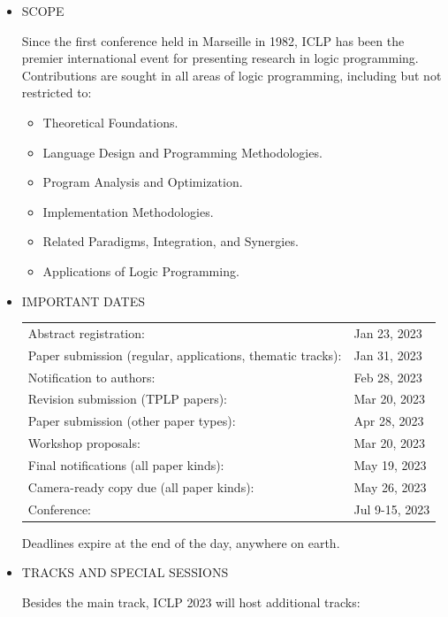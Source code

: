 \documentclass[prodmode,acmtecs]{acmsmall} %
\begin{document}
\begin{itemize}\item  SCOPE 
 
  Since the first conference held in Marseille in 1982, ICLP has been the premier international event for presenting research in logic programming. Contributions are sought in all areas of logic programming, including but not restricted to: 
 
\begin{itemize}\item  Theoretical Foundations.
\item  Language Design and Programming Methodologies.
\item  Program Analysis and Optimization.
\item  Implementation Methodologies.
\item  Related Paradigms, Integration, and Synergies.
\item  Applications of Logic Programming.  
\end{itemize} 
\item  IMPORTANT DATES 
 
\begin{tabulary}{\linewidth}{LL}Abstract registration:  & Jan 23, 2023 \\
Paper submission (regular, applications, thematic tracks):  & Jan 31, 2023 \\
Notification to authors:  & Feb 28, 2023 \\
Revision submission (TPLP papers):  & Mar 20, 2023 \\
Paper submission (other paper types):  & Apr 28, 2023 \\
Workshop proposals:  & Mar 20, 2023 \\
Final notifications (all paper kinds):  & May 19, 2023 \\
Camera-ready copy due (all paper kinds):  & May 26, 2023 \\
Conference:  & Jul 9-15, 2023 \\
\end{tabulary}
 
  Deadlines expire at the end of the day, anywhere on earth. 
 
\item  TRACKS AND SPECIAL SESSIONS 
 
  Besides the main track, ICLP 2023 will host additional tracks: 
 

\end{itemize}
\end{document}
